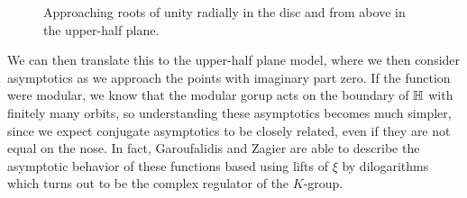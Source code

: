 \begin{figure}[h]
\caption{Approaching roots of unity radially in the disc and from above in the upper-half plane.}
\end{figure}

We can then translate this to the upper-half plane model, where we then consider asymptotics as we approach the points with imaginary part zero. If the function were modular, we know that the modular gorup acts on the boundary of $\mathbb{H}$ with finitely many orbits, so understanding these asymptotics becomes much simpler, since we expect conjugate asymptotics to be closely related, even if they are not equal on the nose. In fact, Garoufalidis and Zagier are able to describe the asymptotic behavior of these functions based using lifts of $\xi$ by dilogarithms which turns out to be the complex regulator of the $K$-group. 

